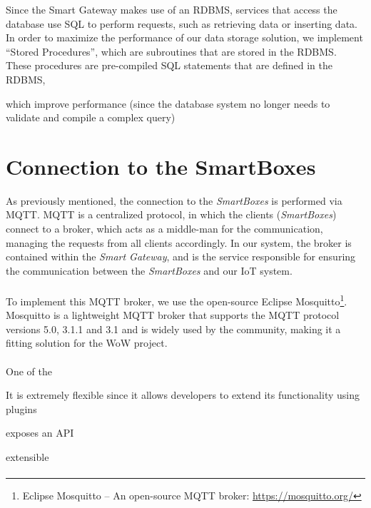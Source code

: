 Since the \acs{Smart Gateway} makes use of an \acs{RDBMS}, services that access the database use \acf{SQL} to perform requests, such as retrieving data or inserting data. In order to maximize the performance of our data storage solution, we implement ``Stored Procedures'', which are subroutines that are stored in the \acs{RDBMS}. These procedures are pre-compiled \acs{SQL} statements that are defined in the \acs{RDBMS}, 


which improve performance (since the database system no longer needs to validate and compile a complex query)

\section{Connection to the SmartBoxes}

As previously mentioned, the connection to the \textit{SmartBoxes} is performed via \acs{MQTT}. \acs{MQTT} is a centralized protocol, in which the clients (\textit{SmartBoxes}) connect to a broker, which acts as a middle-man for the communication, managing the requests from all clients accordingly. In our system, the broker is contained within the \textit{Smart Gateway}, and is the service responsible for ensuring the communication between the \textit{SmartBoxes} and our \acs{IoT} system.

\paragraph{} To implement this \acs{MQTT} broker, we use the open-source Eclipse Mosquitto\footnote{Eclipse Mosquitto -- An open-source \acs{MQTT} broker: \url{https://mosquitto.org/}}. Mosquitto is a lightweight \acs{MQTT} broker that supports the \acs{MQTT} protocol versions 5.0, 3.1.1 and 3.1 and is widely used by the community, making it a fitting solution for the \acs{WoW} project.

\paragraph{} One of the 



It is extremely flexible since it allows developers to extend its functionality using plugins

exposes an \acs{API}

extensible 

\paragraph{} 


